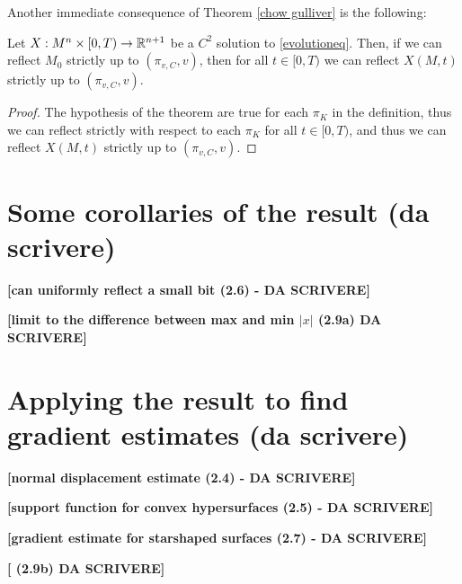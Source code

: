 Another immediate consequence of Theorem \ref{chow gulliver} is the following:
\begin{cor}
	Let $X:M^n\times [0,T) \rightarrow \mathbb{R}^{n+1}$ be a $C^2$ solution to \ref{evolutioneq}. Then, if we can reflect $M_0$ strictly up to $(\pi_{v,C},v)$, then for all $t\in [0,T)$ we can reflect $X(M, t)$ strictly up to $(\pi_{v,C},v)$.  
\end{cor}
\begin{proof}
	The hypothesis of the theorem are true for each $\pi_K$ in the definition, thus we can reflect strictly with respect to each $\pi_K$ for all $t\in[0,T)$, and thus we can reflect $X(M, t)$ strictly up to $(\pi_{v,C},v)$.
\end{proof}



\section{Some corollaries of the result (da scrivere)}


{\LARGE \textbf{[can uniformly reflect a small bit (2.6) - DA SCRIVERE]}}

{\LARGE \textbf{[limit to the difference between max and min $|x|$ (2.9a) DA SCRIVERE]}}

\section{Applying the result to find gradient estimates (da scrivere)}

{\LARGE \textbf{[normal displacement estimate (2.4) - DA SCRIVERE]}}

{\LARGE \textbf{[support function for convex hypersurfaces (2.5) - DA SCRIVERE]}}

{\LARGE \textbf{[gradient estimate for starshaped surfaces (2.7) - DA SCRIVERE]}}

{\LARGE \textbf{[ (2.9b) DA SCRIVERE]}}

